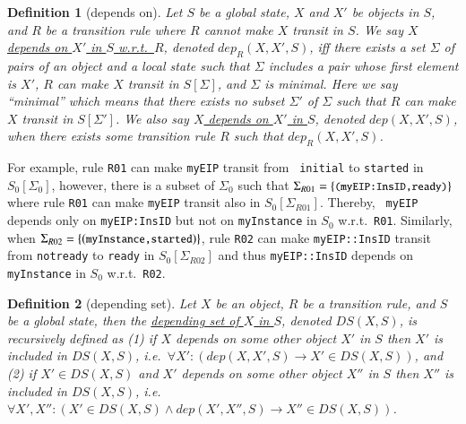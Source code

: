 \documentclass[12pt]{report}
\newtheorem{definition}{Definition}
\newcommand{\ra}{\rightarrow}
\newcommand{\mbstt}[1]{\mbox{\small{\tt {#1}}}}
\newcommand{\ul}{\underline}
\begin{document}
\begin{definition}[depends on]
Let $S$ be a global state, $X$ and $X'$ be objects in $S$, and $R$ be
a transition rule where $R$ cannot make $X$ transit in $S$.  We say
\ul{$X$ depends on $X'$ in $S$ w.r.t.\ $R$}, denoted \ul{$dep_R(X,
  X',S)$}, iff there exists a set $\Sigma$ of pairs of an object and a
local state such that $\Sigma$ includes a pair whose first element is
$X'$, $R$ can make $X$ transit in $S[\Sigma]$, and $\Sigma$ is
minimal.  Here we say ``minimal'' which means that there exists no
subset $\Sigma'$ of $\Sigma$ such that $R$ can make $X$ transit in
$S[\Sigma']$. We also say \ul{$X$ depends on $X'$ in $S$}, denoted
\ul{$dep(X, X',S)$}, when there exists some transition rule $R$ such
that $dep_R(X,X',S)$.
\end{definition}
For example, rule {\tt R01} can make {\tt myEIP} transit from {\tt
  initial} to {\tt started} in $S_0[\Sigma_0]$, however, there is a
subset of $\Sigma_0$ such that
$\Sigma_{R01}=\{\mbstt{(myEIP:InsID,ready)}\}$ where rule {\tt R01}
can make {\tt myEIP} transit also in $S_0[\Sigma_{R01}]$. Thereby, {\tt
  myEIP} depends only on {\tt myEIP:InsID} but not on {\tt myInstance}
in $S_0$ w.r.t.\ {\tt R01}. Similarly, when
$\Sigma_{R02}=\{(\mbstt{myInstance,started})\}$, rule {\tt R02} can
make {\tt myEIP::InsID} transit from {\tt notready} to {\tt ready} in
$S_0[\Sigma_{R02}]$ and thus {\tt myEIP::InsID} depends on {\tt
  myInstance} in $S_0$ w.r.t.\ {\tt R02}.

\begin{definition}[depending set]
Let $X$ be an object, $R$ be a transition rule, and $S$ be a global
state, then the \ul{depending set of $X$ in $S$}, denoted
\ul{$DS(X,S)$}, is recursively defined as (1) if $X$ depends on some
other object $X'$ in $S$ then $X'$ is included in
$DS(X,S)$, i.e.\ $\forall X': (dep(X,X',S) \ra X'\in DS(X,S))$, and
(2) if $X' \in DS(X,S)$ and $X'$ depends on some other object $X''$
in $S$ then $X''$ is included in $DS(X,S)$, i.e.\ $\forall
X',X'': (X'\in DS(X,S) \land dep(X',X'',S) \ra X''\in DS(X,S))$.
\end{definition}
\end{document}
